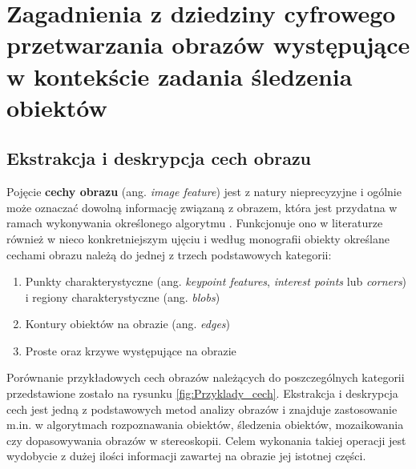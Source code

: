 \chapter{Zagadnienia z dziedziny cyfrowego przetwarzania obrazów występujące w kontekście zadania śledzenia obiektów}
\label{cha:Zagadnienia_z_dziedziny_cyfrowego_przetwarzania_obrazow}

\section{Ekstrakcja i deskrypcja cech obrazu}
\label{sec:Ekstrakcja_i_deskrypcja_cech_obrazu}
Pojęcie \textbf{cechy obrazu} (ang. \textit{image feature}) jest z natury nieprecyzyjne i ogólnie może oznaczać dowolną informację związaną z obrazem, która jest przydatna w ramach wykonywania określonego algorytmu \cite{Campoy2009}. Funkcjonuje ono w literaturze również w nieco konkretniejszym ujęciu i według monografii \cite{Szeliski2011} obiekty określane cechami obrazu należą do jednej z trzech podstawowych kategorii:

\begin{enumerate}
	\item Punkty charakterystyczne (ang. \textit{keypoint features}, \textit{interest points} lub \textit{corners}) i regiony charakterystyczne (ang. \textit{blobs})
	\item Kontury obiektów na obrazie (ang. \textit{edges})
	\item Proste oraz krzywe występujące na obrazie
\end{enumerate}

Porównanie przykładowych cech obrazów należących do poszczególnych kategorii przedstawione zostało na rysunku \ref{fig:Przyklady_cech}. Ekstrakcja i deskrypcja cech jest jedną z podstawowych metod analizy obrazów i znajduje zastosowanie m.in. w algorytmach rozpoznawania obiektów, śledzenia obiektów, mozaikowania czy dopasowywania obrazów w stereoskopii. Celem wykonania takiej operacji jest wydobycie z dużej ilości informacji zawartej na obrazie jej istotnej części.

